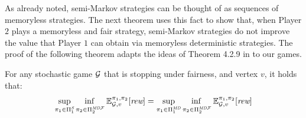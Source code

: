 %	
%	



As already noted, semi-Markov strategies can be thought of as sequences of memoryless strategies. The next theorem uses this fact to show that, when Player $2$ plays a memoryless and fair strategy,  semi-Markov strategies do not improve the value that Player $1$ can obtain via memoryless deterministic strategies. The proof of the following theorem adapts the ideas of Theorem 4.2.9 in \cite{FilarV96} to our games.%

\begin{theorem}\label{th:semimarkov-to-detmemoryless} For any stochastic game $\mathcal{G}$  that is stopping under fairness, and vertex $v$, it holds that:
\[\adjustlimits
	\sup_{\strat{1} \in \SemiMarkovStrats{1}} \inf_{\strat{2} \in \DetMemorylessFairStrats{2}} \Expect{\strat{1}}{\strat{2}}_{\StochG,v}[\Rewards]
	= \adjustlimits
	\sup_{\strat{1} \in \DetMemorylessStrats{1}} \inf_{\strat{2} \in \DetMemorylessFairStrats{2}} \Expect{\strat{1}}{\strat{2}}_{\StochG,v}[\Rewards]
\]
\end{theorem}


